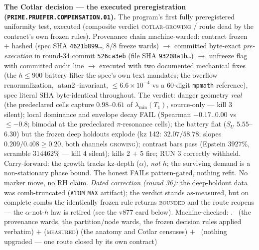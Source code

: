 \documentclass[11pt,a4paper]{article}
\theoremstyle{definition}
\begin{document}
\par\smallskip\noindent\textbf{The Cotlar decision --- the
executed preregistration
(\texttt{PRIME.PRUEFER.\allowbreak COMPENSATION.01}).}
The program's first fully preregistered uniformity test,
executed (composite verdict \textsc{cotlar-growing} / route
dead by the contract's own frozen rules).  Provenance chain
machine-warded: contract frozen $+$ hashed (spec SHA
\texttt{4621b899\ldots}, $8/8$ freeze wards) $\to$ committed
byte-exact \emph{pre-execution} in round-34 commit
\texttt{526ca3eb} (file SHA \texttt{93208a1b\ldots}) $\to$
unfreeze flag with committed audit line $\to$ executed with two
documented mechanical fixes (the $h \le 900$ battery filter the
spec's own text mandates; the overflow renormalization,
$\operatorname{atan2}$-invariant, $\le 6.6\times10^{-4}$ vs a
$60$-digit \texttt{mpmath} reference), spec literal SHA
byte-identical throughout.  The verdict: danger geometry
\emph{real} (the predeclared cells capture $0.98$--$0.61$ of
$\lambda_{\min}(T_1)$, source-only --- kill 3 silent); local
dominance and envelope decay FAIL (Spearman $-0.17..0.00$ vs
$\le -0.8$; bimodal at the predeclared $\pi$-resonance cells);
the battery flat ($S_U$ $5.55$--$6.30$) but the frozen deep
holdouts explode (kz 142: $32.07/58.78$; slopes $0.209/0.408
\ge 0.20$, both channels \textsc{growing}); contrast bars pass
(Epstein $3927\%$, scramble $314462\%$ --- kill 4 silent);
kills 2 $+$ 5 fire; RUN 3 correctly withheld.  Carry-forward:
the growth tracks kz-depth ($\alpha$), \emph{not} $h$; the
surviving demand is a non-stationary phase bound.  The honest
FAILs pattern-gated, nothing refit.  No marker move, no RH
claim.  \emph{Dated correction (round 36):} the deep-holdout
data was comb-truncated ($\texttt{ATOM\_MAX}$ artifact); the
verdict stands as-measured, but on complete combs the
identically frozen rule returns \textsc{bounded} and the route
reopens --- the $\alpha$-not-$h$ law is retired (see the v877
card below).
Machine-checked: .
\mE\ (the provenance wards, the partition/node wards, the
frozen decision rules applied verbatim) $+$
(\textsc{measured}) (the anatomy and Cotlar censuses) $+$
\mO\ (nothing upgraded --- one route closed by its own
contract)
\par\smallskip
\end{document}
